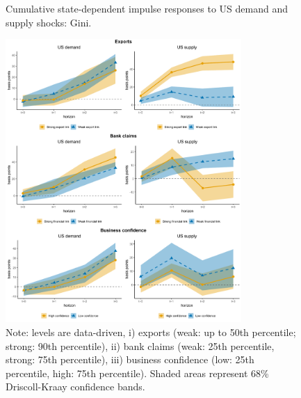 \documentclass[12pt, a4paper]{article}
\begin{document}
\begin{figure}[H]
    \centering
    \caption{Cumulative state-dependent impulse responses to US demand and supply shocks: Gini.}
    \label{fig:demand_supply_channels_ag}
    \includegraphics[width=0.80\textwidth]{Figures/State_Dependent_IRFs_with_CI_Final2.pdf}
    \centering \caption*{Note: levels are data-driven, i) exports (weak: up to 50th percentile; strong: 90th percentile), ii) bank claims (weak: 25th percentile, strong: 75th percentile), iii) business confidence (low: 25th percentile, high: 75th percentile). Shaded areas represent 68\% Driscoll-Kraay confidence bands.}
\end{figure}
\end{document}
